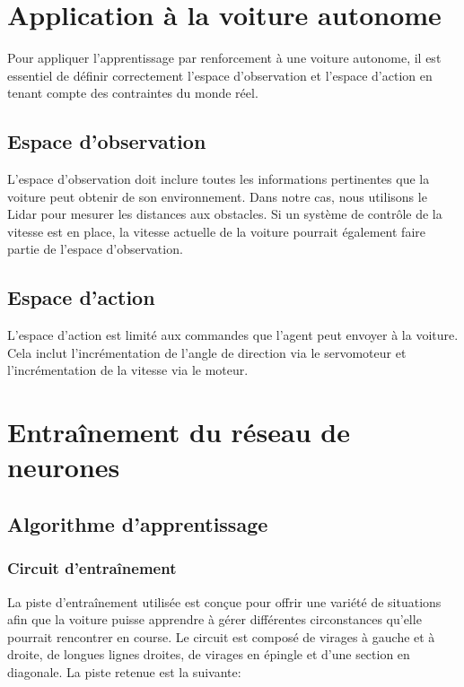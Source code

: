\documentclass[french]{article}
\begin{document}
\section{Application à la voiture autonome}
Pour appliquer l'apprentissage par renforcement à une voiture autonome, il est essentiel de définir correctement 
l'espace d'observation et l'espace d'action en tenant compte des contraintes du monde réel.

\subsection{Espace d'observation}
L'espace d'observation doit inclure toutes les informations pertinentes que la voiture peut obtenir de son environnement.
Dans notre cas, nous utilisons le Lidar pour mesurer les distances aux obstacles. Si un système de contrôle de 
la vitesse est en place, la vitesse actuelle de la voiture pourrait également faire partie de l'espace d'observation.

\subsection{Espace d'action}
L'espace d'action est limité aux commandes que l'agent peut envoyer à la voiture. Cela inclut l'incrémentation de 
l'angle de direction via le servomoteur et l'incrémentation de la vitesse via le moteur.


\section{Entraînement du réseau de neurones}
\subsection{Algorithme d'apprentissage}
\subsubsection*{Circuit d'entraînement}
La piste d'entraînement utilisée est conçue pour offrir une variété de situations afin que la voiture puisse 
apprendre à gérer différentes circonstances qu'elle pourrait rencontrer en course. Le circuit est composé de virages 
à gauche et à droite, de longues lignes droites, de virages en épingle et d'une section en diagonale. 
La piste retenue est la suivante:
\end{document}
